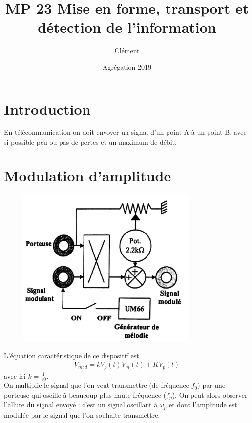 \documentclass[12pt,prb,aps,epsf]{article}
\begin{document}
	
	\title{MP 23 Mise en forme, transport et détection de l'information}
		\author{Clément}
		\date{Agrégation 2019}
		
	\maketitle
	
	\tableofcontents
	
	\pagebreak

\section*{Introduction}
En télécommunication on doit envoyer un signal d'un point A à un point B, avec si possible peu ou pas de pertes et un maximum de débit.

\section{Modulation d'amplitude}
\begin{figure}[h]
	\centering \includegraphics[width=9cm]{modulation}
\end{figure}
L'équation caractéristique de ce dispositif est 
\begin{eqnarray}
V_{mod} = kV_p(t)V_m(t) + KV_p(t)
\end{eqnarray} 
avec ici $k= \frac{1}{10}$.\\
On multiplie le signal que l'on veut transmettre (de fréquence $f_0$) par une porteuse qui oscille à beaucoup plus haute fréquence ($f_p$). On peut alors observer l'allure du signal envoyé : c'est un signal oscillant à $\omega_p$ et dont l'amplitude est modulée par le signal que l'on souhaite transmettre.\\
\end{document}
